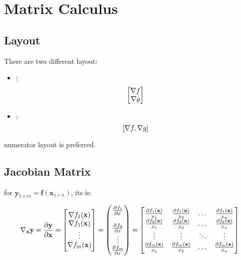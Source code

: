 \section{Matrix Calculus}

\subsection{Layout}


There are two different layout:

\begin{itemize}
	\item {}:
		\begin{equation}
		\mleft [
		\begin{matrix}
		\nabla f \\
		\nabla g
		\end{matrix}
		\mright ]
		\end{equation}
	\item {}:
	\begin{equation}
	\mleft [
	\nabla f ,	\nabla g	\mright ]
	\end{equation}
\end{itemize}

numerator layout is preferred.


\subsection{Jacobian Matrix}
for $\mathbf{y}_{1 \times m} = \mathbf{f}(\mathbf{x}_{1 \times n})$, its  is:

\begin{equation}
	\nabla{}_{\mathbf{x}} \mathbf{y} = 
\frac{\partial \mathbf{y}}{\partial \mathbf{x}} = \mleft [ \begin{matrix}
	\nabla f_1 (\mathbf{x}) \\
	\nabla f_1 (\mathbf{x}) \\
	\vdots \\
	\nabla f_m (\mathbf{x})  
\end{matrix} \mright ] = \begin{pmatrix}
    \pd{f_1}{x} \\
    \\
    \pd{f_2}{x} \\
    \vdots \\
    \pd{f_m}{x} 
    \end{pmatrix} = \mleft [ \begin{matrix}
\frac{\partial f_1({\mathbf{x}})}{x_1} & \frac{\partial f_1({\mathbf{x}})}{x_2} & \dots & \frac{\partial f_1({\mathbf{x}})}{x_n} \\
\frac{\partial f_2({\mathbf{x}})}{x_1} & \frac{\partial f_2({\mathbf{x}})}{x_2} & \dots & \frac{\partial f_2({\mathbf{x}})}{x_n} \\
\vdots & \vdots & \ddots & \vdots  \\
\frac{\partial f_m({\mathbf{x}})}{x_1} & \frac{\partial f_m({\mathbf{x}})}{x_2} & \dots & \frac{\partial f_m({\mathbf{x}})}{x_n}
\end{matrix} \mright ]
\end{equation}

